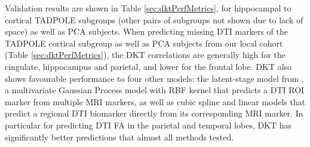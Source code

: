 \documentclass{llncs}
\begin{document}

Validation results are shown in Table \ref{sec:dktPerfMetrics}, for hippocampal to cortical TADPOLE subgroups (other pairs of subgroups not shown due to lack of space) as well as PCA subjects. When predicting missing DTI markers of the TADPOLE cortical subgroup as well as PCA subjects from our local cohort (Table \ref{sec:dktPerfMetrics}), the DKT correlations are generally high for the cingulate, hippocampus and parietal, and lower for the frontal lobe. DKT also shows favourable performance to four other models: the latent-stage model from \cite{jedynak2012computational}, a multivariate Gaussian Process model with RBF kernel that predicts a DTI ROI marker from multiple MRI markers, as well as cubic spline and linear models that predict a regional DTI biomarker directly from its corresponding MRI marker. In particular for predicting DTI FA in the parietal and temporal lobes, DKT has significantly better predictions that almost all methods tested.

\newcommand{\cw}{c}
\end{document}
